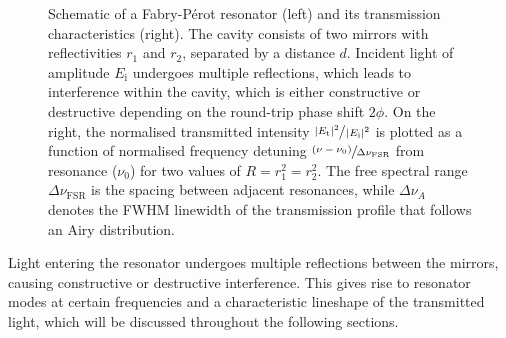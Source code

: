 \documentclass[../Thesis-IJspeert.tex]{subfiles}
\begin{document}
\begin{figure}
	\caption[Schematic of a Fabry-Pérot resonator and its transmission characteristics]{Schematic of a Fabry-Pérot resonator (left) and its transmission characteristics (right). The cavity consists of two mirrors with reflectivities $r_1$ and $r_2$, separated by a distance $d$. Incident light of amplitude $E_\mathrm{i}$ undergoes multiple reflections, which leads to interference within the cavity, which is either constructive or destructive depending on the round-trip phase shift $2\phi$. On the right, the normalised transmitted intensity $\sfrac{\lvert E_\mathrm{t}\rvert^2}{\,\lvert E_\mathrm{i}\rvert^2}$ is plotted as a function of normalised frequency detuning $\sfrac{(\nu - \nu_0)}{\Delta \nu_{\mathrm{FSR}}}$ from resonance ($\nu_0$) for two values of $R=r_1^2=r_2^2$. The free spectral range $\Delta \nu_{\mathrm{FSR}}$ is the spacing between adjacent resonances, while $\Delta \nu_A$ denotes the FWHM linewidth of the transmission profile that follows an Airy distribution.}
	\label{fabryperot} 
\end{figure}
Light entering the resonator undergoes multiple reflections between the mirrors, causing constructive or destructive interference. This gives rise to resonator modes at certain frequencies and a characteristic lineshape of the transmitted light, which will be discussed throughout the following sections.
\end{document}
